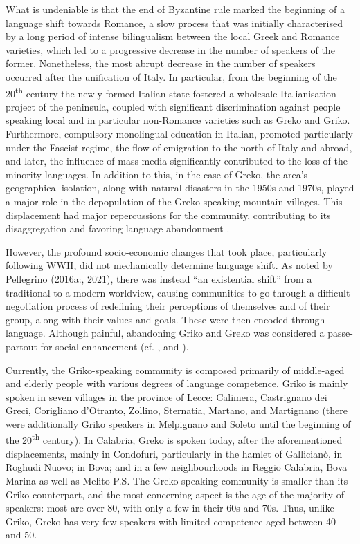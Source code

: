 \documentclass[output=paper,hidelinks]{langscibook}
\begin{document}
What is undeniable is that the end of Byzantine rule marked the beginning of a language shift towards Romance, a slow process that was initially characterised by a long period of intense bilingualism between the local Greek and Romance varieties, which led to a progressive decrease in the number of speakers of the former. Nonetheless, the most abrupt decrease in the number of speakers occurred after the unification of Italy. In particular, from the beginning of the 20\textsuperscript{th} century the newly formed Italian state fostered a wholesale Italianisation project of the peninsula, coupled with significant discrimination against people speaking local and in particular non-Romance varieties such as Greko and Griko. Furthermore, compulsory monolingual education in Italian, promoted particularly under the Fascist regime, the flow of emigration to the north of Italy and abroad, and later, the influence of mass media significantly contributed to the loss of the minority languages. In addition to this, in the case of Greko, the area’s geographical isolation, along with natural disasters in the 1950s and 1970s, played a major role in the depopulation of the Greko-speaking mountain villages. This displacement had major repercussions for the community, contributing to its disaggregation and favoring language abandonment \citep{Stamuli2008, Martino2009, Squillaci2018}. 



However, the profound socio-economic changes that took place, particularly following WWII, did not mechanically determine language shift. As noted by Pellegrino (2016a:, 2021), there was instead “an existential shift” from a traditional to a modern worldview, causing communities to go through a difficult negotiation process of redefining their perceptions of themselves and of their group, along with their values and goals. These were then encoded through language. Although painful, abandoning Griko and Greko was considered a passe-partout for social enhancement (cf. \citealt{Martino1980, Stamuli2008}, and \cite{Squillaci-inprep}). 


\largerpage
Currently, the Griko-speaking community is composed primarily of middle-aged and elderly people with various degrees of language competence. Griko is mainly spoken in seven villages in the province of Lecce: Calimera, Castrignano dei Greci, Corigliano d’Otranto, Zollino, Sternatia, Martano, and Martignano (there were additionally Griko speakers in Melpignano and Soleto until the beginning of the 20\textsuperscript{th} century). In Calabria, Greko is spoken today, after the aforementioned displacements, mainly in Condofuri, particularly in the hamlet of Gallicianò, in Roghudi Nuovo; in Bova; and in a few neighbourhoods in Reggio Calabria, Bova Marina as well as Melito P.S. The Greko-speaking community is smaller than its Griko counterpart, and the most concerning aspect is the age of the majority of speakers: most are over 80, with only a few in their 60s and 70s. Thus, unlike Griko, Greko has very few speakers with limited competence aged between 40 and 50.
\end{document}
